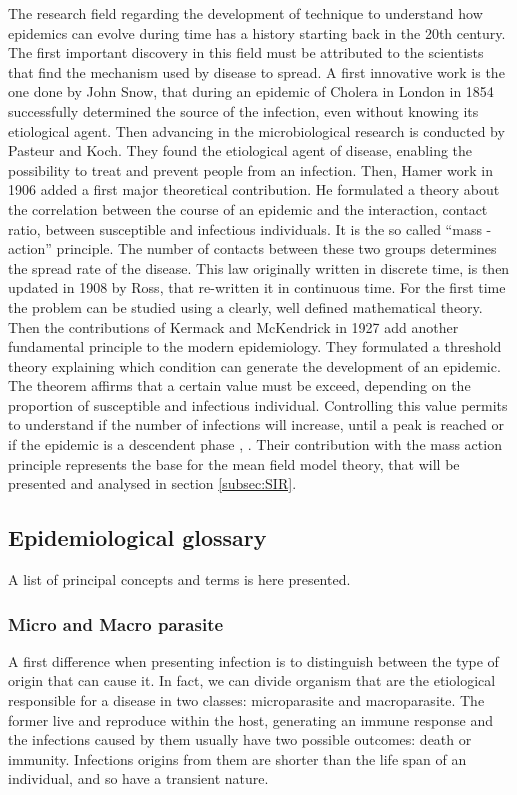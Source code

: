 The research field regarding the development of technique to understand how epidemics can evolve during time has a history starting back in the 20th century. The first important discovery in this field must be attributed to the scientists that find the mechanism used by disease to spread. 
A first innovative work is the one done by John Snow, that during an epidemic of Cholera in London in 1854 successfully determined the source of the infection, even without knowing its etiological agent. Then advancing in the microbiological research is conducted by Pasteur and Koch. They found the etiological agent of disease, enabling the possibility to treat and prevent people from an infection. 
Then, Hamer work in 1906 added a first major theoretical contribution. He formulated a theory about the correlation between the course of an epidemic and the interaction, contact ratio, between susceptible and infectious individuals. It is the so called “mass -action” principle. The number of contacts between these two groups determines the spread rate of the disease. 
This law originally written in discrete time, is then updated in 1908 by Ross, that re-written it  in continuous time. For the first time the problem can be studied using a clearly, well defined mathematical theory. Then the contributions of Kermack and McKendrick in 1927 add another fundamental principle to the modern epidemiology. They formulated a threshold theory explaining which condition can generate the development of an epidemic. The theorem affirms that a certain value must be exceed, depending on the proportion of susceptible and infectious individual. Controlling this value permits to understand if the number of infections will increase, until a peak is reached or if the epidemic is a descendent phase \cite{Mata2021}, \cite{Anderson_82}. 
Their contribution with the mass action principle represents the base for the mean field model theory, that will be presented and analysed in section \ref{subsec:SIR}. 



\subsection{Epidemiological glossary}
A list of principal concepts and terms is here presented.

\subsubsection{Micro and Macro parasite}
	A first difference when presenting infection is to distinguish between the type of origin that can cause it. In fact, we can divide organism that are the etiological responsible for a disease in two classes: microparasite and macroparasite. The former live and reproduce within the host, generating an immune response and the infections caused by them usually have two possible outcomes: death or immunity. Infections origins from them are shorter than the life span of an individual, and so have a transient nature.
	
